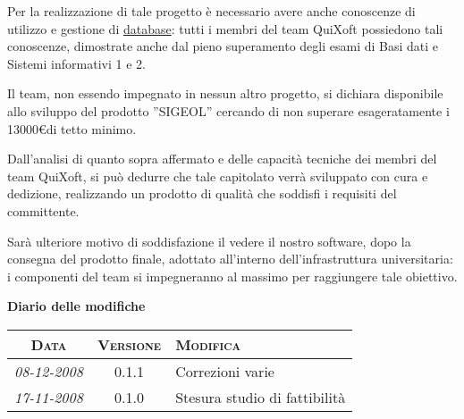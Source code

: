 \documentclass[11pt,a4paper]{article}
\newcommand{\modifiche} 
{
\newpage
\begin{center}
\textbf{Diario delle modifiche} \\
\bigskip
\begin{tabular}{|c|c|p{0.62\textwidth}|}
\hline
\textsc{Data} & \textsc{Versione} & \textsc{Modifica} \\
\hline
\hline
\textit{08-12-2008} & 0.1.1 & Correzioni varie  \\
\hline
\textit{17-11-2008} & 0.1.0 & Stesura studio di fattibilità \\
\hline
\end{tabular}
\end{center}
}
\begin{document}
Per la realizzazione di tale progetto è necessario avere anche conoscenze di utilizzo e gestione di \underline{database}: tutti i membri del team QuiXoft possiedono tali conoscenze, dimostrate anche dal pieno superamento degli esami di Basi dati e Sistemi informativi 1 e 2.

Il team, non essendo impegnato in nessun altro progetto, si dichiara disponibile allo sviluppo del prodotto ''SIGEOL'' cercando di non superare esageratamente i 13000\euro \space di tetto minimo.

Dall'analisi di quanto sopra affermato e delle capacità tecniche dei membri del team QuiXoft, si può dedurre che tale capitolato verrà sviluppato con cura e dedizione, realizzando un prodotto di qualità che soddisfi i requisiti del committente.

Sarà ulteriore motivo di soddisfazione il vedere il nostro software, dopo la consegna del prodotto finale, adottato all'interno dell'infrastruttura universitaria: i componenti  del team si impegneranno al massimo per raggiungere tale obiettivo.
\modifiche
\end{document}
